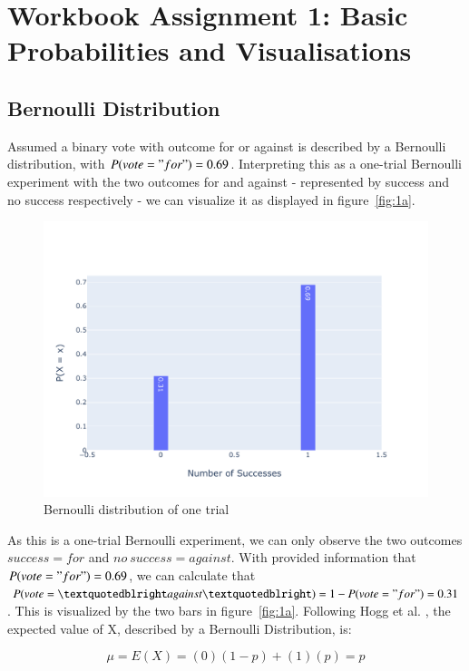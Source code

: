 \chapter{Workbook Assignment 1: Basic Probabilities and Visualisations}

\section{Bernoulli Distribution}

Assumed a binary vote with outcome for or against is described by a Bernoulli distribution, with $P(vote = "for") = 0.69$. 
Interpreting this as a one-trial Bernoulli experiment with the two outcomes for and against - represented by success and no success respectively - we can visualize it as displayed in figure~\eqref{fig:1a}.


\begin{figure}[h]
\centering
\includegraphics[width=16cm]{pics/1a.pdf}
\caption{Bernoulli distribution of one trial}
\label{fig:1a}
\end{figure}
\FloatBarrier


As this is a one-trial Bernoulli experiment, we can only observe the two outcomes $success = for$ and $no~success = against$. With provided information that $P(vote = "for") = 0.69$, we can calculate that $P(vote=”against”) = 1 - P(vote = "for") = 0.31$. This is visualized by the two bars in figure~\eqref{fig:1a}. Following Hogg et al. \cite[Chapter~3.1]{hogg}, the expected value of X, described by a Bernoulli Distribution, is: 

\begin{equation}  \mu = E(X) = (0)(1-p) + (1)(p) = p
\label{eq:expvaluebernoulli}\end{equation}

